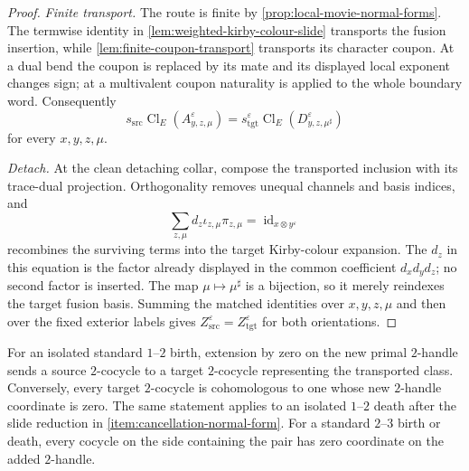 \begin{proof}
\emph{Finite transport.}
The route is finite by \cref{prop:local-movie-normal-forms}.  The termwise
identity in \cref{lem:weighted-kirby-colour-slide} transports the fusion
insertion, while \cref{lem:finite-coupon-transport} transports its character
coupon.  At a dual bend the coupon is replaced by its mate and its displayed
local exponent changes sign; at a multivalent coupon naturality is applied to
the whole boundary word.  Consequently
\[
  s_{\mathrm{src}}\operatorname{Cl}_E
    (A^\varepsilon_{y,z,\mu})
  =s_{\mathrm{tgt}}^\varepsilon\operatorname{Cl}_E
    (D^\varepsilon_{y,z,\mu^\sharp})
\]
for every $x,y,z,\mu$.

\emph{Detach.}
At the clean detaching collar, compose the transported inclusion with its
trace-dual projection.  Orthogonality removes unequal channels and basis
indices, and
\[
  \sum_{z,\mu}d_z\iota_{z,\mu}\pi_{z,\mu}
  =\operatorname{id}_{x\otimes y^\varepsilon}
\]
recombines the surviving terms into the target Kirby-colour expansion.  The
$d_z$ in this equation is the factor already displayed in the common
coefficient $d_xd_yd_z$; no second factor is inserted.  The map
$\mu\mapsto\mu^\sharp$ is a bijection, so it merely reindexes the target
fusion basis.  Summing the matched identities over $x,y,z,\mu$ and then over
the fixed exterior labels gives
$Z_{\mathrm{src}}^\varepsilon=Z_{\mathrm{tgt}}^\varepsilon$ for both
orientations.
\end{proof}

\begin{lemma}
\label{lem:cancellation-cochain-normal-forms}
For an isolated standard $1$--$2$ birth, extension by zero on the new primal
$2$-handle sends a source $2$-cocycle to a target $2$-cocycle representing
the transported class.  Conversely, every target $2$-cocycle is cohomologous
to one whose new $2$-handle coordinate is zero.  The same statement applies
to an isolated $1$--$2$ death after the slide reduction in
\cref{item:cancellation-normal-form}.  For a standard $2$--$3$ birth or
death, every cocycle on the side containing the pair has zero coordinate on
the added $2$-handle.
\end{lemma}

